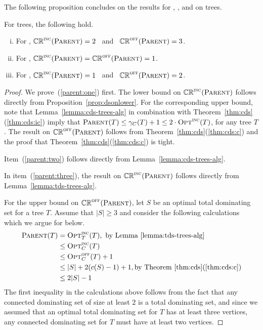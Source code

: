 The following proposition concludes on the results for \ds, \cds, and
\tds on trees.

\begin{proposition}
\label{prop:parent}
For trees, the following hold.
\begin{enumerate}[(i)]
\item \label{parent:one}
For \ds, $\mathbb{CR}^{\textsc{\ensuremath{\text{inc}}}}(\operatorname{\textsc{Parent}}) = 2$ \, and \, $\mathbb{CR}^{\textsc{off}}(\operatorname{\textsc{Parent}}) = 3$.
\item \label{parent:two}
For \cds, $\mathbb{CR}^{\textsc{\ensuremath{\text{inc}}}}(\operatorname{\textsc{Parent}}) = \mathbb{CR}^{\textsc{off}}(\operatorname{\textsc{Parent}}) = 1$. 
\item \label{parent:three}
For \tds, $\mathbb{CR}^{\textsc{\ensuremath{\text{inc}}}}(\operatorname{\textsc{Parent}})=1$ \, and \, $\mathbb{CR}^{\textsc{off}}(\operatorname{\textsc{Parent}})=2$.
\end{enumerate}
\end{proposition}
\begin{proof}
We prove~(\ref{parent:one}) first.
The lower bound on $\mathbb{CR}^{\textsc{\ensuremath{\text{inc}}}}(\operatorname{\textsc{Parent}})$ follows directly from
Proposition~\ref{prop:dsonlower}.
For the corresponding upper bound, note that
Lemma~\ref{lemma:cds-trees-alg} in combination with
Theorem~\ref{thm:cds}(\ref{thm:cds:ic}) 
imply that 
$\operatorname{\textsc{Parent}}(T) \leq \gamma_C(T) +1 \leq 2 \cdot \operatorname{\textsc{Opt}}^\textsc{\ensuremath{\text{inc}}}(T)$,
for any tree $T$. 
The result on $\mathbb{CR}^{\textsc{off}}(\operatorname{\textsc{Parent}})$ follows from
Theorem~\ref{thm:cds}(\ref{thm:cds:c}) and the proof that
Theorem~\ref{thm:cds}(\ref{thm:cds:c}) is tight. 

Item~(\ref{parent:two}) follows directly from Lemma~\ref{lemma:cds-trees-alg}.

In item~(\ref{parent:three}),
the result on $\mathbb{CR}^{\textsc{\ensuremath{\text{inc}}}}(\operatorname{\textsc{Parent}})$ follows directly from
Lemma~\ref{lemma:tds-trees-alg}.

For the upper bound on $\mathbb{CR}^{\textsc{off}}(\operatorname{\textsc{Parent}})$, let $S$ be an optimal total
dominating set for a tree $T$. Assume that $|S| \geq 3$ and consider
the following calculations which we argue for below.
\begin{align*}
\operatorname{\textsc{Parent}}(T) 
& =    \operatorname{\textsc{Opt}}^\textsc{\ensuremath{\text{inc}}}_T(T), \text{ by Lemma~\ref{lemma:tds-trees-alg}}\\
& \leq \operatorname{\textsc{Opt}}^\textsc{\ensuremath{\text{inc}}}_C(T)\\ & \leq \operatorname{\textsc{Opt}}^\textsc{off}_C(T)+1\\ & \leq |S| + 2(c(S)-1) +1, \text{by
  Theorem~\ref{thm:cds}(\ref{thm:cds:c})}\\
& \leq 2|S|-1 \end{align*}
The first inequality in the calculations above follows from the fact
that any connected dominating set of size at least $2$ is a total
dominating set, and since we assumed that an optimal total dominating set
for $T$ has at least three vertices, any connected dominating set for
$T$ must have at least two vertices.


\end{proof}
